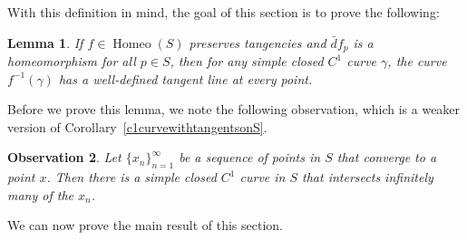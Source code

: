 \documentclass[sn-mathphys-num]{sn-jnl}%
\theoremstyle{thmstyleone}%
\newtheorem{lemma}{Lemma}[section]
\newtheorem{obs}[lemma]{Observation}
\theoremstyle{thmstyletwo}%
\theoremstyle{thmstylethree}%
\DeclareMathOperator{\homeo}{Homeo}
\begin{document}
With this definition in mind,  the goal of this section is to prove the following: 

\begin{lemma}\label{inversetangentline}
If $f \in \homeo(S)$ preserves tangencies and $\bar{d}f_p$ is a homeomorphism for all $p \in S$, then for any simple closed $C^1$ curve $\gamma$,  the curve $f^{-1}(\gamma)$ has a well-defined tangent line at every point.
\end{lemma}

\noindent Before we prove this lemma,  we note the following observation,  which is a weaker version of Corollary~\ref{c1curvewithtangentsonS}.

\begin{obs}\label{c1connectthedots}
Let $\{x_n\}_{n=1}^{\infty}$ be a sequence of points in $S$ that converge to a point $x$. Then there is a simple closed $C^1$ curve in $S$ that intersects infinitely many of the $x_n$.
\end{obs}

\noindent We can now prove the main result of this section.
\end{document}
